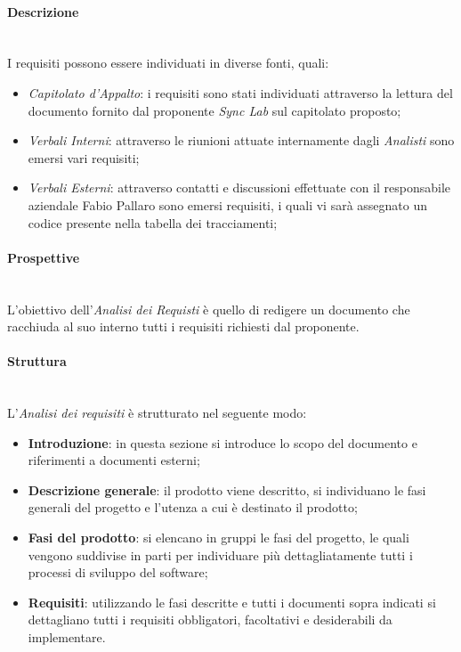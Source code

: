 \paragraph{Descrizione}\label{2.2.3.1.2}\mbox{}\\
I requisiti possono essere individuati in diverse fonti, quali:
\begin{itemize}
	\item \textit{Capitolato d'Appalto}: i requisiti sono stati individuati attraverso la lettura del documento fornito dal proponente \textit{Sync Lab} sul capitolato proposto;
	\item \textit{Verbali Interni}: attraverso le riunioni attuate internamente dagli \textit{Analisti} sono emersi vari requisiti;
	\item \textit{Verbali Esterni}: attraverso contatti e discussioni effettuate con il responsabile aziendale Fabio Pallaro sono emersi requisiti, i quali vi sarà assegnato un codice presente nella tabella dei tracciamenti;
\end{itemize}
\paragraph{Prospettive}\label{2.2.3.1.3}\mbox{}\\
L'obiettivo dell'\textit{Analisi dei Requisti} è quello di redigere un documento che racchiuda al suo interno tutti i requisiti richiesti dal proponente.
\paragraph{Struttura}\label{2.2.3.1.4}\mbox{}\\ %
L'\textit{Analisi dei requisiti} è strutturato nel seguente modo:
\begin{itemize}
	\item \textbf{Introduzione}: in questa sezione si introduce lo scopo del documento e riferimenti a documenti esterni;
	\item \textbf{Descrizione generale}: il prodotto viene descritto, si individuano le fasi generali del progetto e l'utenza a cui è destinato il prodotto;
	\item \textbf{Fasi del prodotto}: si elencano in gruppi le fasi del progetto, le quali vengono suddivise in parti per individuare più dettagliatamente tutti i processi di sviluppo del software;
	\item \textbf{Requisiti}: utilizzando le fasi descritte e tutti i documenti sopra indicati si dettagliano tutti i requisiti obbligatori, facoltativi e desiderabili da implementare.
\end{itemize}
